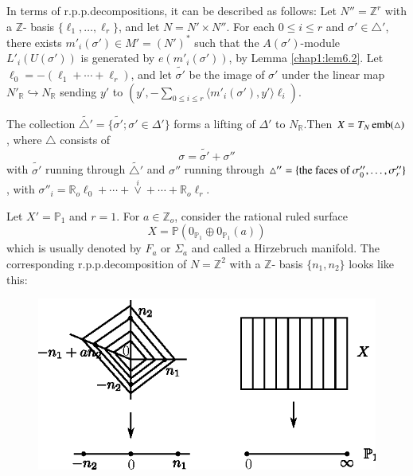 	In terms of r.p.p.decompositions, it can be described as
        follows: Let $N'' = \mathbb{Z}^{r}$ with a $\mathbb{Z}$- basis
        $\{\ell_{1}, \ldots , \ell_{r}\}$, and let $N = N' \times N''$. For
        each $0 \leq i \leq r$ and $\sigma' \in \triangle'$, there
        exists $m'_{i} (\sigma') \in M' = (N')^{*}$ such that the $A(
        \sigma')$-module $L'_{i}(U(\sigma'))$ is generated by $e
        (m'_{i}(\sigma'))$, by Lemma \ref{chap1:lem6.2}. Let $\ell_{0} = -
        (\ell_{1} + \cdots + \ell_{r}) $, and let $\tilde{\sigma'}$ be
        the image of $\sigma'$ under the linear map $N'_{\mathbb{R}}
        \hookrightarrow N_{\mathbb{R}}$ sending $y'$ to $(y', -
        \sum\limits_{0 \leq i \leq r} \langle m'_{i} (\sigma') , y' \rangle
        \ell_{i})$. 

\noindent
The collection $\tilde{\triangle'} = \{ \tilde{\sigma'} ; \sigma' \in
\Delta'\}$ forms a lifting of $\Delta'$ to
$N_{\mathbb{R}}$.\pageoriginale Then $X =
T_{N} \operatorname{emb} (\triangle)$, where $\triangle$ consists of  
$$
\sigma = \tilde{\sigma'} + \sigma''
$$
with $\tilde{\sigma'}$ running through $\tilde{\triangle'}$ and
$\sigma''$ running through $\triangle'' = \{\text{the faces of }\break
\sigma''_{0} , \ldots, \sigma''_{r}\}$, with $\sigma''_{i} =
\mathbb{R}_{o} \ell_{0} + \cdots + \overset{i}{\vee} + \cdots +
\mathbb{R}_{o}\ell_{r}$.  

\begin{example*}
Let $X' = \mathbb{P}_{1}$ and $r = 1$. For $a \in \mathbb{Z}_{o}$,
consider the rational ruled surface  
$$
X = \mathbb{P} (0_{\mathbb{P}_{1}} \oplus 0_{\mathbb{P}_{1}} (a))
$$
which is usually denoted by $F_{a}$ or $\Sigma_{a}$ and called a
Hirzebruch manifold. The corresponding r.p.p.decomposition of $N=
\mathbb{Z}^{2}$ with a $\mathbb{Z}$- basis $\{n_{1}, n_{2}\}$ looks
like this: 

\begin{figure}[H]
\centering 
\includegraphics{vol58-fig/fig58-6.eps} 
\end{figure}

\end{example*}

